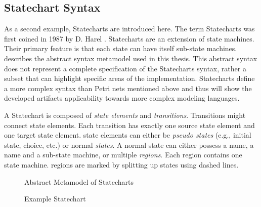 \subsection{Statechart Syntax}
\label{sec:statecharts}
As a second example, Statecharts are introduced here. The term Statecharts was first coined in 1987 by D. Harel \cite{harel_statecharts_1987}. Statecharts are an extension of state machines. Their primary feature is that each state can have itself sub-state machines.  describes the abstract syntax metamodel used in this thesis. This abstract syntax does not represent a complete specification of the Statecharts syntax, rather a subset that can highlight specific areas of the implementation. Statecharts define a more complex syntax than Petri nets mentioned above and thus will show the developed artifacts applicability towards more complex modeling languages.



A Statechart is composed of \emph{state elements} and \emph{transitions}. Transitions might connect state elements. Each transition has exactly one source state element and one target state element. state elements can either be \emph{pseudo states} (e.g., initial state, choice, etc.) or normal \emph{states}. A normal state can either possess a name, a name and a sub-state machine, or multiple \emph{regions}. Each region contains one state machine. regions are marked by splitting up states using dashed lines. 


\begin{figure}[H]
  \centering
  
  \caption{Abstract Metamodel of Statecharts}
  \label{fig:statechartmm}
  \end{figure}


\begin{figure}[H]
\centering

\caption{Example Statechart}
\label{fig:state-example}
\end{figure}




